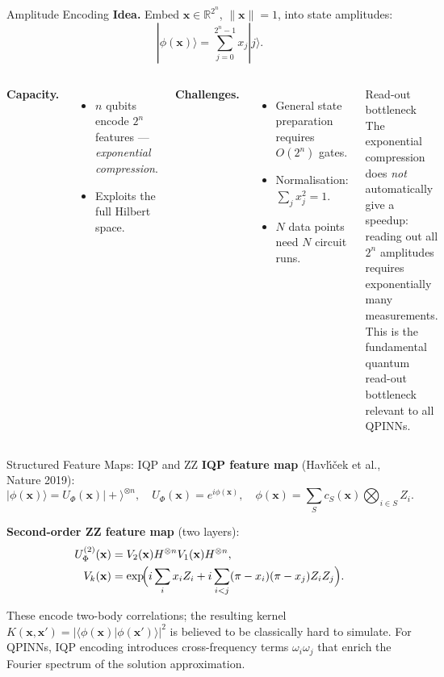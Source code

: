\documentclass[aspectratio=169,11pt]{beamer}
\newcommand{\R}{\mathbb{R}}
\newcommand{\bx}{\mathbf{x}}
\begin{document}
\begin{frame}{Amplitude Encoding}
  \textbf{Idea.} Embed $\bx\in\R^{2^n}$, $\|\bx\|=1$, into
  state amplitudes:
  \[
    |\phi(\bx)\rangle = \sum_{j=0}^{2^n-1} x_j |j\rangle.
  \]

  \begin{columns}[T]
    \textbf{Capacity.}
    \begin{itemize}
      \item $n$ qubits encode $2^n$ features ---
            \emph{exponential compression}.
      \item Exploits the full Hilbert space.
    \end{itemize}
    \medskip
    \textbf{Challenges.}
    \begin{itemize}
      \item General state preparation requires $O(2^n)$ gates.
      \item Normalisation: $\sum_j x_j^2=1$.
      \item $N$ data points need $N$ circuit runs.
    \end{itemize}
    \begin{alertblock}{Read-out bottleneck}
      The exponential compression does \emph{not} automatically
      give a speedup: reading out all $2^n$ amplitudes requires
      exponentially many measurements.
      This is the fundamental quantum read-out bottleneck
      relevant to all QPINNs.
    \end{alertblock}
  \end{columns}
\end{frame}

\begin{frame}{Structured Feature Maps: IQP and ZZ}
  \textbf{IQP feature map} (Havl\'{\i}\v{c}ek et al., Nature 2019):
  \[
    |\phi(\bx)\rangle = U_\Phi(\bx)|+\rangle^{\otimes n},
    \quad
    U_\Phi(\bx) = e^{i\phi(\bx)},
    \quad
    \phi(\bx) = \sum_S c_S(\bx)\bigotimes_{i\in S}Z_i.
  \]

  \medskip
  \textbf{Second-order ZZ feature map} (two layers):
  \begin{align*}
    U_\Phi^{(2)}(\bx)
    &= V_2(\bx)H^{\otimes n}V_1(\bx)H^{\otimes n},\\
    V_k(\bx)
    &= \exp\!\Bigl(i\sum_i x_i Z_i
       + i\sum_{i<j}(\pi-x_i)(\pi-x_j)Z_iZ_j\Bigr).
  \end{align*}

  \medskip
  These encode two-body correlations; the resulting kernel
  $K(\bx,\bx')=\bigl|\langle\phi(\bx)|\phi(\bx')\rangle\bigr|^2$
  is believed to be classically hard to simulate.
  For QPINNs, IQP encoding introduces cross-frequency terms
  $\omega_i\omega_j$ that enrich the Fourier spectrum of
  the solution approximation.
\end{frame}
\end{document}
